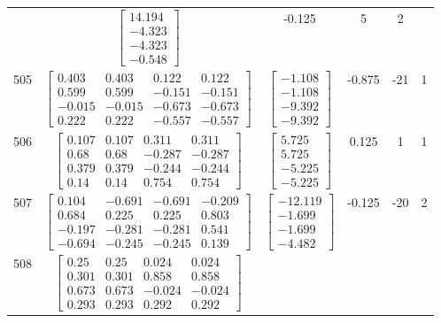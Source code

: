 \documentclass[a4paper,12pt]{article}
\begin{document}
\begin{tabular}{c c c c c c}
&
$\begin{bmatrix} 14.194 \\ -4.323 \\ -4.323 \\ -0.548 \end{bmatrix}$
&
-0.125
&
5
&
2
\\
505
&
$\begin{bmatrix} 0.403 & 0.403 & 0.122 & 0.122 \\ 0.599 & 0.599 & -0.151 & -0.151 \\ -0.015 & -0.015 & -0.673 & -0.673 \\ 0.222 & 0.222 & -0.557 & -0.557 \end{bmatrix}$
&
$\begin{bmatrix} -1.108 \\ -1.108 \\ -9.392 \\ -9.392 \end{bmatrix}$
&
-0.875
&
-21
&
1
\\
506
&
$\begin{bmatrix} 0.107 & 0.107 & 0.311 & 0.311 \\ 0.68 & 0.68 & -0.287 & -0.287 \\ 0.379 & 0.379 & -0.244 & -0.244 \\ 0.14 & 0.14 & 0.754 & 0.754 \end{bmatrix}$
&
$\begin{bmatrix} 5.725 \\ 5.725 \\ -5.225 \\ -5.225 \end{bmatrix}$
&
0.125
&
1
&
1
\\
507
&
$\begin{bmatrix} 0.104 & -0.691 & -0.691 & -0.209 \\ 0.684 & 0.225 & 0.225 & 0.803 \\ -0.197 & -0.281 & -0.281 & 0.541 \\ -0.694 & -0.245 & -0.245 & 0.139 \end{bmatrix}$
&
$\begin{bmatrix} -12.119 \\ -1.699 \\ -1.699 \\ -4.482 \end{bmatrix}$
&
-0.125
&
-20
&
2
\\
508
&
$\begin{bmatrix} 0.25 & 0.25 & 0.024 & 0.024 \\ 0.301 & 0.301 & 0.858 & 0.858 \\ 0.673 & 0.673 & -0.024 & -0.024 \\ 0.293 & 0.293 & 0.292 & 0.292 \end{bmatrix}$

\end{tabular}
\end{document}
